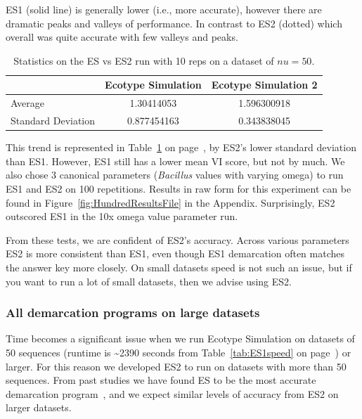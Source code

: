 ES1 (solid line) is generally lower (i.e., more accurate), however there are dramatic peaks and valleys of performance.
In contrast to ES2 (dotted) which overall was quite accurate with few valleys and peaks.
\begin{table}
    \begin{tabular}{l|cc}
    ~                  & Ecotype Simulation & Ecotype Simulation 2 \\ \hline
    Average            & 1.30414053         & 1.596300918          \\
    Standard Deviation & 0.877454163        & 0.343838045          \\
    \end{tabular}
    \caption[ES versus ES2 statistics.]{Statistics on the ES vs ES2 run with 10 reps on a dataset of $nu=50$.}
    \label{tab:ESvES2mean}
\end{table}
This trend is represented in Table~\ref{tab:ESvES2mean} on page~\pageref{tab:ESvES2mean}, by ES2's lower standard deviation than ES1.
However, ES1 still has a lower mean VI score, but not by much.
We also chose 3 canonical parameters (\emph{Bacillus} values with varying omega) to run ES1 and ES2 on 100 repetitions.
Results in raw form for this experiment can be found in Figure~\ref{fig:HundredResultsFile} in the Appendix.
Surprisingly, ES2 outscored ES1 in the 10x omega value parameter run.

From these tests, we are confident of ES2's accuracy.
Across various parameters ES2 is more consistent than ES1, even though ES1 demarcation often matches the answer key more closely.
On small datasets speed is not such an issue, but if you want to run a lot of small datasets, then we advise using ES2.

\subsubsection*{All demarcation programs on large datasets}
Time becomes a significant issue when we run Ecotype Simulation on datasets of 50 sequences (runtime is \textasciitilde2390 seconds from Table~\ref{tab:ES1speed} on page~\pageref{tab:ES1speed}) or larger.
For this reason we developed ES2 to run on datasets with more than 50 sequences.
From past studies we have found ES to be the most accurate demarcation program~\cite{carlo}, and we expect similar levels of accuracy from ES2 on larger datasets.

